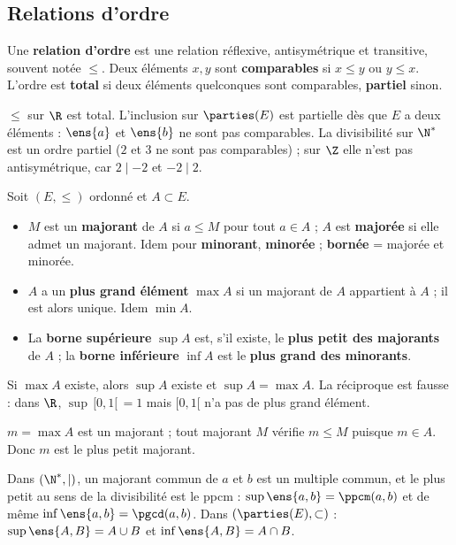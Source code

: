 \subsection{Relations d'ordre}
\begin{definition}[Ordre]
Une \textbf{relation d'ordre} est une relation réflexive, antisymétrique et transitive, souvent notée $\le$. Deux éléments $x,y$ sont \textbf{comparables} si $x\le y$ ou $y\le x$. L'ordre est \textbf{total} si deux éléments quelconques sont comparables, \textbf{partiel} sinon.
\end{definition}
\begin{exemple}
$\le$ sur $\R$ est total. L'inclusion sur $\parties(E)$ est partielle dès que $E$ a deux éléments : $\ens{a}$ et $\ens{b}$ ne sont pas comparables. La divisibilité sur $\N^*$ est un ordre partiel ($2$ et $3$ ne sont pas comparables) ; sur $\Z$ elle n'est pas antisymétrique, car $2\mid -2$ et $-2\mid 2$.
\end{exemple}
\begin{definition}\label{def-sup}
Soit $(E,\le)$ ordonné et $A\subset E$.
\begin{itemize}
\item $M$ est un \textbf{majorant} de $A$ si $a\le M$ pour tout $a\in A$ ; $A$ est \textbf{majorée} si elle admet un majorant. Idem pour \textbf{minorant}, \textbf{minorée} ; \textbf{bornée} = majorée et minorée.
\item $A$ a un \textbf{plus grand élément} $\max A$ si un majorant de $A$ appartient à $A$ ; il est alors unique. Idem $\min A$.
\item La \textbf{borne supérieure} $\sup A$ est, s'il existe, le \textbf{plus petit des majorants} de $A$ ; la \textbf{borne inférieure} $\inf A$ est le \textbf{plus grand des minorants}.
\end{itemize}
\end{definition}
\begin{proposition}
Si $\max A$ existe, alors $\sup A$ existe et $\sup A=\max A$. La réciproque est fausse : dans $\R$, $\sup\,[0,1[\,=1$ mais $[0,1[$ n'a pas de plus grand élément.
\end{proposition}
\begin{preuve}
$m=\max A$ est un majorant ; tout majorant $M$ vérifie $m\le M$ puisque $m\in A$. Donc $m$ est le plus petit majorant.
\end{preuve}
\begin{exemple}[Divisibilité]
Dans $(\N^*,\mid)$, un majorant commun de $a$ et $b$ est un multiple commun, et le plus petit au sens de la divisibilité est le ppcm : $\sup\ens{a,b}=\ppcm(a,b)$ et de même $\inf\ens{a,b}=\pgcd(a,b)$. Dans $(\parties(E),\subset)$ : $\sup\ens{A,B}=A\cup B$ et $\inf\ens{A,B}=A\cap B$.
\end{exemple}

